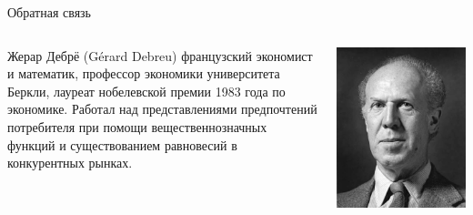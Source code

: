 \documentclass{beamer}
\begin{document}
\begin{frame}{Обратная связь}

\begin{columns}
\begin{column}{0.5\textwidth}
   \alert{Жерар Дебрё} (Gérard Debreu) французский экономист и математик, профессор экономики университета Беркли, лауреат нобелевской премии 1983 года по экономике. Работал над \alert{представлениями предпочтений потребителя при помощи вещественнозначных функций} и существованием равновесий в конкурентных рынках.
\end{column}
\begin{column}{0.5\textwidth}  %
    \begin{center}
     \includegraphics[width=1\textwidth]{debreu.jpg}
     \end{center}
\end{column}
\end{columns}

\end{frame}
\end{document}
